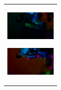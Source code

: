 \begin{figure}[htbp]
\begin{tabular}{l}
\begin{minipage}{0.165\hsize}
        \begin{center}
          \includegraphics[clip, width=2.5cm]{./Figures/optic_commandshoo4.eps}
          \hspace{0.1cm} { }
        \end{center}
      \end{minipage}
      \begin{minipage}{0.165\hsize}
        \begin{center}
          \includegraphics[clip, width=2.5cm]{./Figures/optic_commandshoo5.eps}
          \hspace{2.2cm} { }
        \end{center}
      \end{minipage}
\\ %


\end{tabular}
\end{figure}
